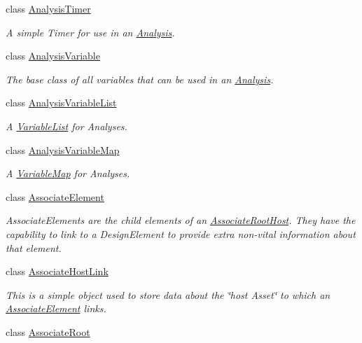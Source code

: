 \begin{DoxyCompactItemize}
class \hyperlink{class_picto_1_1_analysis_timer}{Analysis\-Timer}
\begin{DoxyCompactList}\small\item\em A simple Timer for use in an \hyperlink{class_picto_1_1_analysis}{Analysis}. \end{DoxyCompactList}\item 
class \hyperlink{class_picto_1_1_analysis_variable}{Analysis\-Variable}
\begin{DoxyCompactList}\small\item\em The base class of all variables that can be used in an \hyperlink{class_picto_1_1_analysis}{Analysis}. \end{DoxyCompactList}\item 
class \hyperlink{class_picto_1_1_analysis_variable_list}{Analysis\-Variable\-List}
\begin{DoxyCompactList}\small\item\em A \hyperlink{class_picto_1_1_variable_list}{Variable\-List} for Analyses. \end{DoxyCompactList}\item 
class \hyperlink{class_picto_1_1_analysis_variable_map}{Analysis\-Variable\-Map}
\begin{DoxyCompactList}\small\item\em A \hyperlink{class_picto_1_1_variable_map}{Variable\-Map} for Analyses. \end{DoxyCompactList}\item 
class \hyperlink{class_picto_1_1_associate_element}{Associate\-Element}
\begin{DoxyCompactList}\small\item\em Associate\-Elements are the child elements of an \hyperlink{class_picto_1_1_associate_root_host}{Associate\-Root\-Host}. They have the capability to link to a Design\-Element to provide extra non-\/vital information about that element. \end{DoxyCompactList}\item 
class \hyperlink{class_picto_1_1_associate_host_link}{Associate\-Host\-Link}
\begin{DoxyCompactList}\small\item\em This is a simple object used to store data about the \char`\"{}host Asset\char`\"{} to which an \hyperlink{class_picto_1_1_associate_element}{Associate\-Element} links. \end{DoxyCompactList}\item 
class \hyperlink{class_picto_1_1_associate_root}{Associate\-Root}

\end{DoxyCompactItemize}
